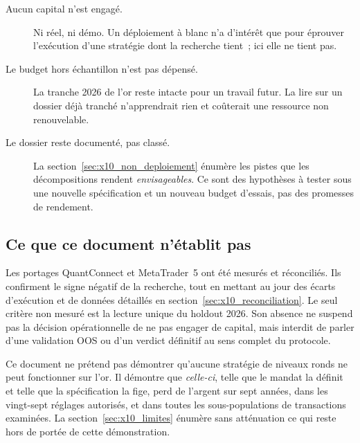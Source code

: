 \begin{description}
  \item[Aucun capital n'est engagé.] Ni réel, ni démo. Un déploiement à blanc
  n'a d'intérêt que pour éprouver l'exécution d'une stratégie dont la
  recherche tient~; ici elle ne tient pas.
  \item[Le budget hors échantillon n'est pas dépensé.] La tranche 2026 de l'or
  reste intacte pour un travail futur. La lire sur un dossier déjà tranché
  n'apprendrait rien et coûterait une ressource non renouvelable.
  \item[Le dossier reste documenté, pas classé.] La
  section~\ref{sec:x10_non_deploiement} énumère les pistes que les
  décompositions rendent \emph{envisageables}. Ce sont des hypothèses à
  tester sous une nouvelle spécification et un nouveau budget d'essais, pas des
  promesses de rendement.
\end{description}

\subsection*{Ce que ce document n'établit pas}

Les portages QuantConnect et MetaTrader~5 ont été mesurés et réconciliés.
Ils confirment le signe négatif de la recherche, tout en mettant au jour des
écarts d'exécution et de données détaillés en
section~\ref{sec:x10_reconciliation}. Le seul critère non mesuré est la lecture
unique du holdout 2026. Son absence ne suspend pas la décision opérationnelle
de ne pas engager de capital, mais interdit de parler d'une validation OOS ou
d'un verdict définitif au sens complet du protocole.

Ce document ne prétend pas démontrer qu'aucune stratégie de niveaux ronds ne
peut fonctionner sur l'or. Il démontre que \emph{celle-ci}, telle que le mandat
la définit et telle que la spécification la fige, perd de l'argent sur sept
années, dans les vingt-sept réglages autorisés, et dans toutes les
sous-populations de transactions examinées. La section~\ref{sec:x10_limites}
énumère sans atténuation ce qui reste hors de portée de cette démonstration.

